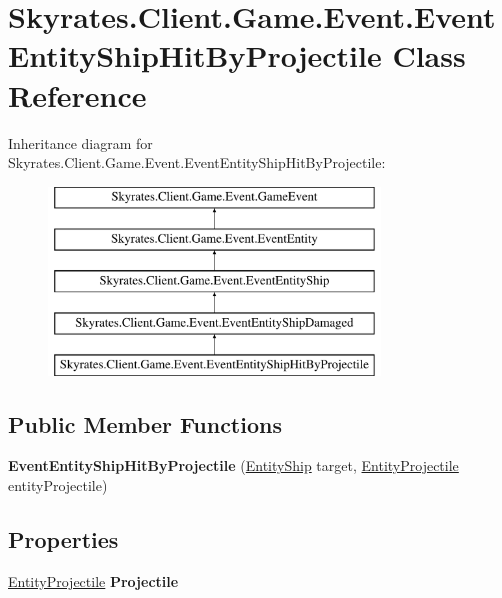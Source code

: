 \hypertarget{class_skyrates_1_1_client_1_1_game_1_1_event_1_1_event_entity_ship_hit_by_projectile}{\section{Skyrates.\-Client.\-Game.\-Event.\-Event\-Entity\-Ship\-Hit\-By\-Projectile Class Reference}
\label{class_skyrates_1_1_client_1_1_game_1_1_event_1_1_event_entity_ship_hit_by_projectile}
}
Inheritance diagram for Skyrates.\-Client.\-Game.\-Event.\-Event\-Entity\-Ship\-Hit\-By\-Projectile\-:\begin{figure}[H]
\begin{center}
\leavevmode
\includegraphics[height=5.000000cm]{class_skyrates_1_1_client_1_1_game_1_1_event_1_1_event_entity_ship_hit_by_projectile}
\end{center}
\end{figure}
\subsection*{Public Member Functions}
\begin{DoxyCompactItemize}
\item 
\hypertarget{class_skyrates_1_1_client_1_1_game_1_1_event_1_1_event_entity_ship_hit_by_projectile_ac90a49bd0e6c20e2bbcbac31965fe013}{{\bfseries Event\-Entity\-Ship\-Hit\-By\-Projectile} (\hyperlink{class_skyrates_1_1_client_1_1_entity_1_1_entity_ship}{Entity\-Ship} target, \hyperlink{class_skyrates_1_1_client_1_1_entity_1_1_entity_projectile}{Entity\-Projectile} entity\-Projectile)}\label{class_skyrates_1_1_client_1_1_game_1_1_event_1_1_event_entity_ship_hit_by_projectile_ac90a49bd0e6c20e2bbcbac31965fe013}

\end{DoxyCompactItemize}
\subsection*{Properties}
\begin{DoxyCompactItemize}
\item 
\hypertarget{class_skyrates_1_1_client_1_1_game_1_1_event_1_1_event_entity_ship_hit_by_projectile_a278251a91678e0e27991998354e16455}{\hyperlink{class_skyrates_1_1_client_1_1_entity_1_1_entity_projectile}{Entity\-Projectile} {\bfseries Projectile}}\label{class_skyrates_1_1_client_1_1_game_1_1_event_1_1_event_entity_ship_hit_by_projectile_a278251a91678e0e27991998354e16455}

\end{DoxyCompactItemize}
